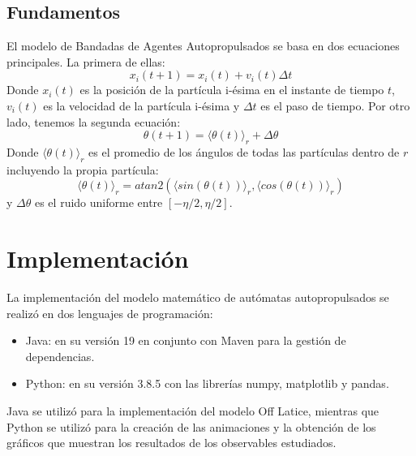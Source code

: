 \documentclass[11pt]{article}
\begin{document}
        \subsection{Fundamentos}

            El modelo de Bandadas de Agentes Autopropulsados se basa en dos ecuaciones principales. La primera de ellas:
            \begin{equation}
                x_i(t+1) = x_i(t) + v_i(t) \Delta t
            \end{equation}
            Donde $x_i(t)$ es la posición de la partícula i-ésima en el instante de tiempo $t$, $v_i(t)$ es la velocidad de la partícula i-ésima
            y $\Delta t$ es el paso de tiempo.
            Por otro lado, tenemos la segunda ecuación:
            \begin{equation}
                \theta(t+1) = \langle \theta(t) \rangle_r+ \Delta \theta
            \end{equation}
            Donde $\langle \theta(t) \rangle_r$ es el promedio de los ángulos de todas las partículas dentro de $r$ incluyendo la propia
            partícula:
            \begin{equation}
                \langle \theta(t) \rangle_r = atan2(\langle sin(\theta(t)) \rangle_r, \langle cos(\theta(t)) \rangle_r)
            \end{equation}
            y $\Delta \theta$ es el ruido uniforme entre $[-\eta/2, \eta/2]$.

    \newpage

    \section{Implementación}

    La implementación del modelo matemático de autómatas autopropulsados se realizó en dos lenguajes de programación:
    \begin{itemize}
        \item Java: en su versión 19 en conjunto con Maven para la gestión de dependencias.
        \item Python: en su versión 3.8.5 con las librerías numpy, matplotlib y pandas.
    \end{itemize}

    Java se utilizó para la implementación del modelo Off Latice, mientras que Python se utilizó para la creación de las
    animaciones y la obtención de los gráficos que muestran los resultados de los observables estudiados.
\end{document}
